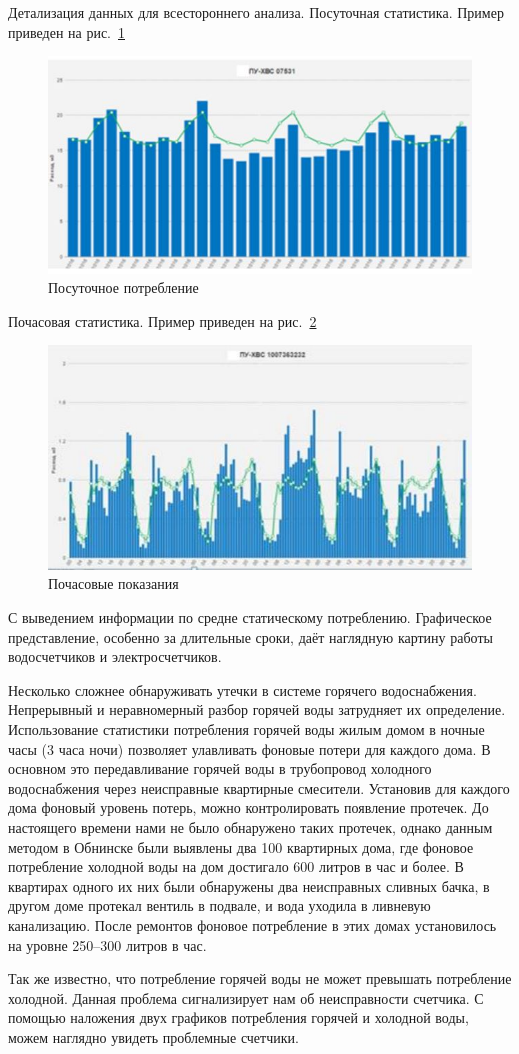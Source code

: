 Детализация данных для всестороннего анализа.
Посуточная статистика. Пример приведен на рис.~\ref{fig:day}
\begin{figure}[H]
	\centering
	\includegraphics[width=0.7\linewidth]{pics/day}
	\caption{Посуточное потребление}
	\label{fig:day} 
\end{figure}
Почасовая статистика. Пример приведен на рис.~\ref{fig:hour}
\begin{figure}[H]
	\centering
	\includegraphics[width=0.7\linewidth]{pics/hour}
	\caption{Почасовые показания}
	\label{fig:hour} 
\end{figure}

С выведением информации по средне статическому потреблению.
Графическое представление, особенно за длительные сроки, даёт наглядную картину работы водосчетчиков и электросчетчиков. 

Несколько сложнее обнаруживать утечки в системе горячего водоснабжения. Непрерывный и неравномерный разбор горячей воды затрудняет их определение. Использование статистики потребления горячей воды жилым домом в ночные часы (3 часа ночи) позволяет улавливать фоновые потери для каждого дома. В основном это передавливание горячей воды в трубопровод холодного водоснабжения через неисправные квартирные смесители. Установив для каждого дома фоновый уровень потерь, можно контролировать появление протечек. До настоящего времени нами не было обнаружено таких протечек, однако данным методом в Обнинске были выявлены два 100 квартирных дома, где фоновое потребление холодной воды на дом достигало 600 литров в час и более. В квартирах одного их них были обнаружены два неисправных сливных бачка, в другом доме протекал вентиль в подвале, и вода уходила в ливневую канализацию. После ремонтов фоновое потребление в этих домах установилось на уровне 250–300 литров в час. \cite{journal2}

Так же известно, что потребление горячей воды не может превышать потребление холодной. Данная проблема сигнализирует нам об неисправности счетчика. С помощью наложения двух графиков потребления горячей и холодной воды, можем наглядно увидеть проблемные счетчики.